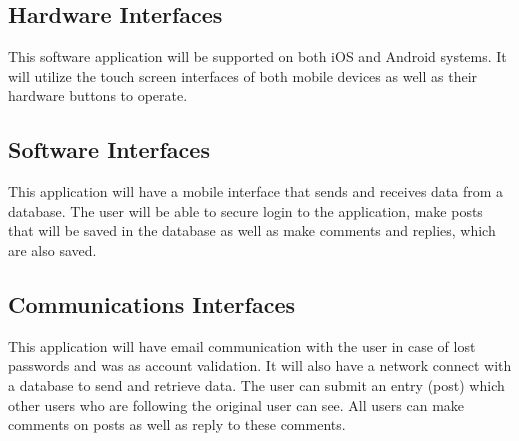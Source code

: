 \documentclass[letterpaper, 10, draftclsnofoot, onecolumn]{IEEEtran}
\begin{document}
\subsection{Hardware Interfaces}
This software application will be supported on both iOS and Android systems. It will utilize the touch screen interfaces of both mobile devices as well as their hardware buttons to operate. 


\subsection{Software Interfaces}
This application will have a mobile interface that sends and receives data from a database. The user will be able to secure login to the application, make posts that will be saved in the database as well as make comments and replies, which are also saved. 


\subsection{Communications Interfaces}
This application will have email communication with the user in case of lost passwords and was as account validation. It will also have a network connect with a database to send and retrieve data. The user can submit an entry (post) which other users who are following the original user can see. All users can make comments on posts as well as reply to these comments. 
\end{document}

